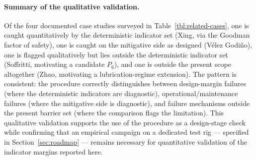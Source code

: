 \paragraph{Summary of the qualitative validation.}
Of the four documented case studies surveyed in
Table~\ref{tbl:related-cases}, one is caught quantitatively by the
deterministic indicator set (Xing, via the Goodman factor of
safety), one is caught on the mitigative side as designed
(V\'elez Godi\~no), one is flagged qualitatively but lies outside
the deterministic indicator set (Soffritti, motivating a candidate
$P_{6}$), and one is outside the present scope altogether (Zhao,
motivating a lubrication-regime extension). The pattern is
consistent: the procedure correctly distinguishes between
design-margin failures (where the deterministic indicators are
diagnostic), operational/maintenance failures (where the mitigative
side is diagnostic), and failure mechanisms outside the present
barrier set (where the comparison flags the limitation). This
qualitative validation supports the use of the procedure as a
design-stage check while confirming that an empirical campaign on
a dedicated test rig --- specified in Section~\ref{sec:roadmap}
--- remains necessary for quantitative validation of the indicator
margins reported here.
